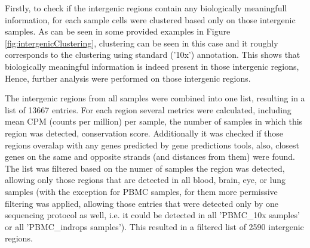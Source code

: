 \iffalse

Firstly, to check if the intergenic regions contain any biologically meaningfull information,
for each sample cells were clustered based only on those intergenic samples.
As can be seen in some provided examples in Figure \ref{fig:intergenicClustering},
clustering can be seen in this case and it roughly corresponds to the clustering using standard ('10x') annotation.
This shows that biologically meaningful information is indeed present in those intergenic regions,
Hence, further analysis were performed on those intergenic regions.

The intergenic regions from all samples were combined into one list, resulting in a list of 13667 entries.
For each region several metrics were calculated, including mean CPM (counts per million) per sample,
the number of samples in which this region was detected, conservation score.
Additionally it was checked if those regions overalap with any genes predicted by gene predictions tools,
also, closest genes on the same and opposite strands (and distances from them) were found.
The list was filtered based on the numer of samples the region was detected, allowing only those regions that are detected in all
blood, brain, eye, or lung samples (with the exception for PBMC samples,
for them more permissive filtering was applied, allowing those entries that were detected only by one sequencing protocol as well,
i.e. it could be detected in all 'PBMC\_10x samples' or all 'PBMC\_indrops samples').
This resulted in a filtered list of 2590 intergenic regions.

